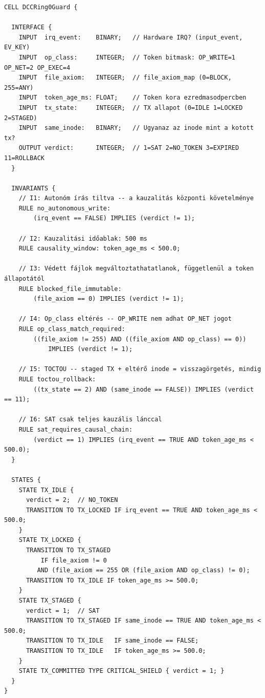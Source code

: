 \documentclass[11pt,a4paper,twoside]{article}
\begin{document}
\begin{lstlisting}[style=biostyle,caption={DCCRing0Guard -- kanonikus \texttt{.bio} specifikáció}]
CELL DCCRing0Guard {

  INTERFACE {
    INPUT  irq_event:    BINARY;   // Hardware IRQ? (input_event, EV_KEY)
    INPUT  op_class:     INTEGER;  // Token bitmask: OP_WRITE=1 OP_NET=2 OP_EXEC=4
    INPUT  file_axiom:   INTEGER;  // file_axiom_map (0=BLOCK, 255=ANY)
    INPUT  token_age_ms: FLOAT;    // Token kora ezredmasodpercben
    INPUT  tx_state:     INTEGER;  // TX allapot (0=IDLE 1=LOCKED 2=STAGED)
    INPUT  same_inode:   BINARY;   // Ugyanaz az inode mint a kotott tx?
    OUTPUT verdict:      INTEGER;  // 1=SAT 2=NO_TOKEN 3=EXPIRED 11=ROLLBACK
  }

  INVARIANTS {
    // I1: Autonóm írás tiltva -- a kauzalitás központi követelménye
    RULE no_autonomous_write:
        (irq_event == FALSE) IMPLIES (verdict != 1);

    // I2: Kauzalitási időablak: 500 ms
    RULE causality_window: token_age_ms < 500.0;

    // I3: Védett fájlok megváltoztathatatlanok, függetlenül a token állapotától
    RULE blocked_file_immutable:
        (file_axiom == 0) IMPLIES (verdict != 1);

    // I4: Op_class eltérés -- OP_WRITE nem adhat OP_NET jogot
    RULE op_class_match_required:
        ((file_axiom != 255) AND ((file_axiom AND op_class) == 0))
            IMPLIES (verdict != 1);

    // I5: TOCTOU -- staged TX + eltérő inode = visszagörgetés, mindig
    RULE toctou_rollback:
        ((tx_state == 2) AND (same_inode == FALSE)) IMPLIES (verdict == 11);

    // I6: SAT csak teljes kauzális lánccal
    RULE sat_requires_causal_chain:
        (verdict == 1) IMPLIES (irq_event == TRUE AND token_age_ms < 500.0);
  }

  STATES {
    STATE TX_IDLE {
      verdict = 2;  // NO_TOKEN
      TRANSITION TO TX_LOCKED IF irq_event == TRUE AND token_age_ms < 500.0;
    }
    STATE TX_LOCKED {
      TRANSITION TO TX_STAGED
          IF file_axiom != 0
         AND (file_axiom == 255 OR (file_axiom AND op_class) != 0);
      TRANSITION TO TX_IDLE IF token_age_ms >= 500.0;
    }
    STATE TX_STAGED {
      verdict = 1;  // SAT
      TRANSITION TO TX_STAGED IF same_inode == TRUE AND token_age_ms < 500.0;
      TRANSITION TO TX_IDLE   IF same_inode == FALSE;
      TRANSITION TO TX_IDLE   IF token_age_ms >= 500.0;
    }
    STATE TX_COMMITTED TYPE CRITICAL_SHIELD { verdict = 1; }
  }
}
\end{lstlisting}
\end{document}
